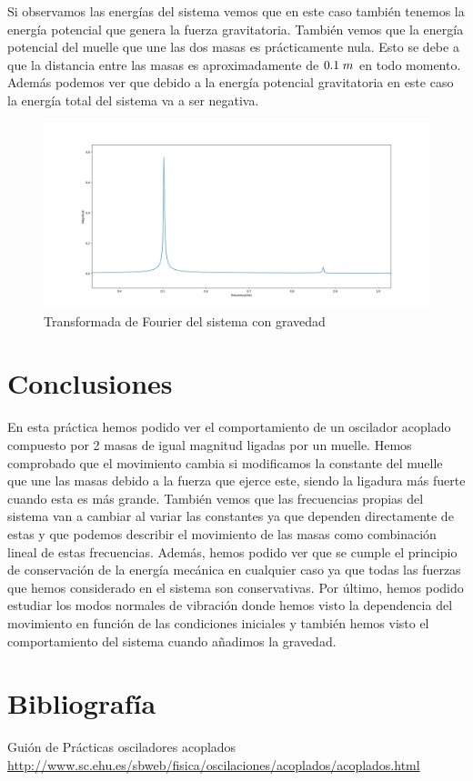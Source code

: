 \documentclass{article}
\begin{document}
Si observamos las energías del sistema vemos que en este caso también tenemos la energía potencial que genera la fuerza gravitatoria. También vemos que la energía potencial del muelle que une las dos masas es prácticamente nula. Esto se debe a que la distancia entre las masas es aproximadamente de $0.1\hspace{0.1cm}m$ en todo momento. Además podemos ver que debido a la energía potencial gravitatoria en este caso la energía total del sistema va a ser negativa.
\begin{figure}[H]
    \centering
    \includegraphics[width=1.0\textwidth]{gravedad_fourier}
\caption{Transformada de Fourier del sistema con gravedad}
\label{fig:f20}
\end{figure}
\section{Conclusiones}
En esta práctica hemos podido ver el comportamiento de un oscilador acoplado compuesto por 2 masas de igual magnitud ligadas por un muelle. Hemos comprobado que el movimiento cambia si modificamos la constante del muelle que une las masas debido a la fuerza que ejerce este, siendo la ligadura más fuerte cuando esta es más grande.\newline\linebreak
También vemos que las frecuencias propias del sistema van a cambiar al variar las constantes ya que dependen directamente de estas y que podemos describir el movimiento de las masas como combinación lineal de estas frecuencias.\newline\linebreak
Además, hemos podido ver que se cumple el principio de conservación de la energía mecánica en cualquier caso ya que todas las fuerzas que hemos considerado en el sistema son conservativas.\newline\linebreak
Por último, hemos podido estudiar los modos normales de vibración donde hemos visto la dependencia del movimiento en función de las condiciones iniciales y también hemos visto el comportamiento del sistema cuando añadimos la gravedad.
\section{Bibliografía}
\begin{thebibliography}{99}
Guión de Prácticas osciladores acoplados
\url{http://www.sc.ehu.es/sbweb/fisica/oscilaciones/acoplados/acoplados.html}

\end{thebibliography}
\end{document}
